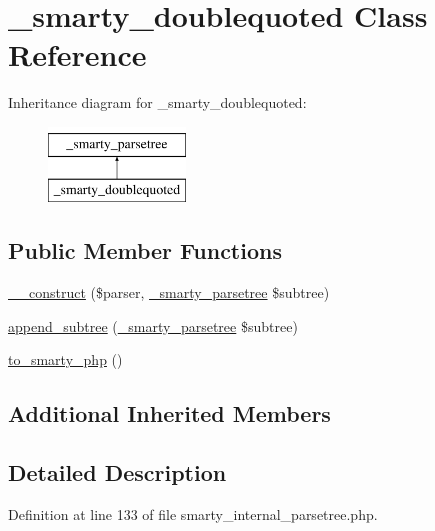 \hypertarget{class__smarty__doublequoted}{\section{\-\_\-smarty\-\_\-doublequoted Class Reference}
\label{class__smarty__doublequoted}
}
Inheritance diagram for \-\_\-smarty\-\_\-doublequoted\-:\begin{figure}[H]
\begin{center}
\leavevmode
\includegraphics[height=2.000000cm]{class__smarty__doublequoted}
\end{center}
\end{figure}
\subsection*{Public Member Functions}
\begin{DoxyCompactItemize}
\item 
\hyperlink{class__smarty__doublequoted_a217cb18685ac7fa2d242504395908dd4}{\-\_\-\-\_\-construct} (\$parser, \hyperlink{class__smarty__parsetree}{\-\_\-smarty\-\_\-parsetree} \$subtree)
\item 
\hyperlink{class__smarty__doublequoted_ad32418d110611233d407e4aa45794a7e}{append\-\_\-subtree} (\hyperlink{class__smarty__parsetree}{\-\_\-smarty\-\_\-parsetree} \$subtree)
\item 
\hyperlink{class__smarty__doublequoted_a4ce3aac464de8eedd8a5f0389402cf47}{to\-\_\-smarty\-\_\-php} ()
\end{DoxyCompactItemize}
\subsection*{Additional Inherited Members}


\subsection{Detailed Description}


Definition at line 133 of file smarty\-\_\-internal\-\_\-parsetree.\-php.



